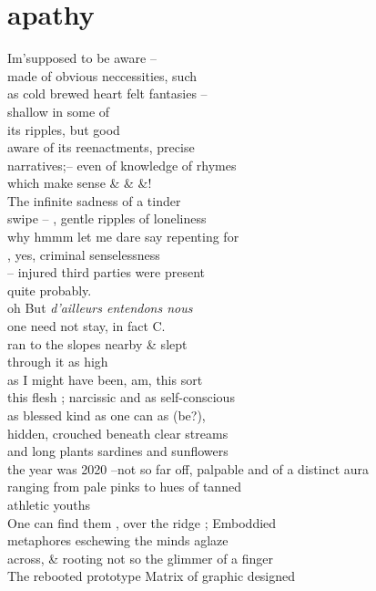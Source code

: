 \clearpage
\section*{apathy}

\setlength{\parindent}{0cm}

Im'supposed to be aware -- \\
made of obvious neccessities, such\\
as cold brewed heart felt fantasies --\\
shallow in some of\\
its ripples, but good\\
aware of its reenactments, precise\\
narratives;--
even of knowledge of rhymes\\
which make sense \& \& \&!\\
The infinite sadness of a tinder\\
swipe -- , gentle ripples of loneliness\\
why hmmm let me dare say repenting for\\
, yes,  criminal senselessness\\
-- injured third parties were present\\
\phantom{} quite probably. \\ 
oh But \textit{d'ailleurs entendons nous}\\
one need not stay, in fact C. \\
ran to the slopes nearby \& slept\\
through it as high \\
as I might have been, am, this sort\\
this flesh ; narcissic and as self-conscious\\
as blessed kind as one can as (be?), \\
hidden, crouched beneath clear streams\\
and long plants sardines and sunflowers \\
the year was 2020
--not so far off, palpable and of a distinct aura\\
ranging from pale pinks to hues of tanned\\
athletic youths\\
One can find them , over the ridge ; Emboddied \\
\clearpage
metaphores eschewing the minds aglaze\\
across, \& rooting not so the glimmer of a finger\\
The rebooted prototype Matrix of graphic designed\\
